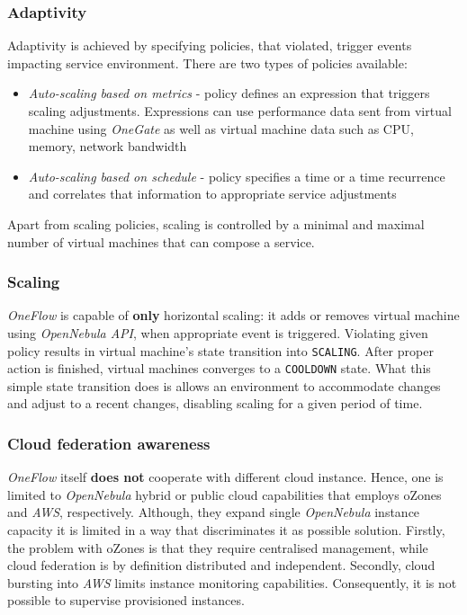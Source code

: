 \subsubsection{Adaptivity}
Adaptivity is achieved by specifying policies, that violated, trigger events impacting service environment. There are two types of policies available:
\begin{itemize}
 \item \emph{Auto-scaling based on metrics} - policy defines an expression that triggers scaling adjustments. Expressions can use performance data sent from virtual machine using \emph{OneGate} as well as virtual machine data such as CPU, memory, network bandwidth
 \item \emph{Auto-scaling based on schedule} - policy specifies a time or a time recurrence and correlates that information to appropriate service adjustments
\end{itemize}

Apart from scaling policies, scaling is controlled by a minimal and maximal number of virtual machines that can compose a service.

\subsubsection{Scaling}
\emph{OneFlow} is capable of \textbf{only} horizontal scaling: it adds or removes virtual machine using \emph{OpenNebula API}, when appropriate event is triggered. Violating given policy results in virtual machine's state transition into \texttt{SCALING}. After proper action is finished, virtual machines converges to a \texttt{COOLDOWN} state. What this simple state transition does is allows an environment to accommodate changes and adjust to a recent changes, disabling scaling for a given period of time.


\subsubsection{Cloud federation awareness}
\emph{OneFlow} itself \textbf{does not} cooperate with different cloud instance. Hence, one is limited to \emph{OpenNebula} hybrid or public cloud capabilities that employs oZones and \emph{AWS}, respectively. Although, they expand single \emph{OpenNebula} instance capacity it is limited in a way that discriminates it as possible solution. Firstly, the problem with oZones is that they require centralised management, while cloud federation is by definition distributed and independent. Secondly, cloud bursting into \emph{AWS} limits instance monitoring capabilities. Consequently, it is not possible to supervise provisioned instances.

